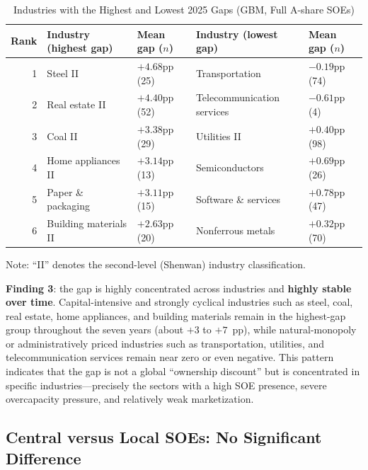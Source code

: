 \documentclass[11pt,a4paper]{article}
\begin{document}
\begin{table}[htbp]
\centering
\caption{Industries with the Highest and Lowest 2025 Gaps (GBM, Full A-share SOEs)}
\label{tab:industry}
\begin{threeparttable}
\small
\begin{tabularx}{\linewidth}{r >{\raggedright\arraybackslash}X l >{\raggedright\arraybackslash}X l}
\toprule
Rank & Industry (highest gap) & Mean gap ($n$) & Industry (lowest gap) & Mean gap ($n$) \\
\midrule
1 & Steel II & $+4.68$pp (25) & Transportation & $-0.19$pp (74) \\
2 & Real estate II & $+4.40$pp (52) & Telecommunication services & $-0.61$pp (4) \\
3 & Coal II & $+3.38$pp (29) & Utilities II & $+0.40$pp (98) \\
4 & Home appliances II & $+3.14$pp (13) & Semiconductors & $+0.69$pp (26) \\
5 & Paper \& packaging & $+3.11$pp (15) & Software \& services & $+0.78$pp (47) \\
6 & Building materials II & $+2.63$pp (20) & Nonferrous metals & $+0.32$pp (70) \\
\bottomrule
\end{tabularx}
\begin{tablenotes}
\footnotesize\raggedright
\item Note: ``II'' denotes the second-level (Shenwan) industry classification.
\end{tablenotes}
\end{threeparttable}
\end{table}

\medskip
\noindent\textbf{Finding 3}: the gap is highly concentrated across industries and \textbf{highly stable over time}. Capital-intensive and strongly cyclical industries such as steel, coal, real estate, home appliances, and building materials remain in the highest-gap group throughout the seven years (about $+3$ to $+7$~pp), while natural-monopoly or administratively priced industries such as transportation, utilities, and telecommunication services remain near zero or even negative. This pattern indicates that the gap is not a global ``ownership discount'' but is concentrated in specific industries---precisely the sectors with a high SOE presence, severe overcapacity pressure, and relatively weak marketization.

\subsection{Central versus Local SOEs: No Significant Difference}
\end{document}
